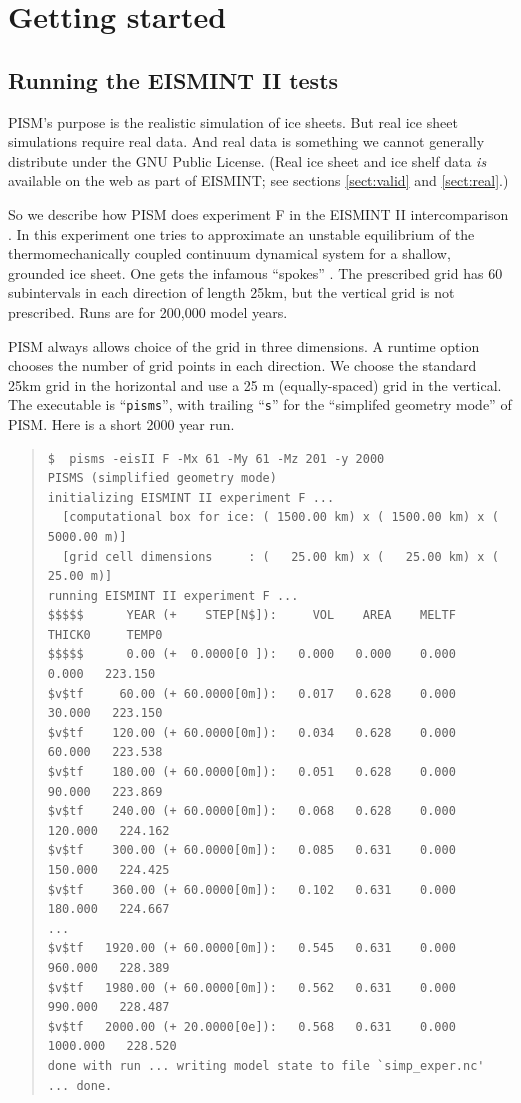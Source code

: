\documentclass[12pt,final]{amsart}
\renewcommand{\t}[1]{\texttt{#1}}
\begin{document}
\clearpage\newpage
\section{Getting started}\label{sect:start}

\subsection{Running the EISMINT II tests}  PISM's purpose is the realistic simulation of ice sheets.  But real ice sheet simulations require real data.  And real data is something we cannot generally distribute under the GNU Public License.  (Real ice sheet and ice shelf data \emph{is} available on the web as part of EISMINT; see sections \ref{sect:valid} and \ref{sect:real}.)

So we describe how PISM does experiment F in the EISMINT II intercomparison \cite{EISMINT00}.  In this experiment one tries to approximate an unstable equilibrium of the thermomechanically coupled continuum dynamical system for a shallow, grounded ice sheet.  One gets the infamous ``spokes'' \cite{BBL,PayneBaldwin}.  The prescribed grid has 60 subintervals in each direction of length 25km, but the vertical grid is not prescribed.  Runs are for 200,000 model years.

PISM always allows choice of the grid in three dimensions.  A runtime option chooses the number of grid points in each direction.  We choose the standard 25km grid in the horizontal and use a 25 m (equally-spaced) grid in the vertical.  The executable is ``\t{pisms}'', with trailing ``\t{s}'' for the ``simplifed geometry mode'' of PISM.  Here is a short 2000 year run.

\small\begin{quote}\begin{verbatim}
$  pisms -eisII F -Mx 61 -My 61 -Mz 201 -y 2000
PISMS (simplified geometry mode)
initializing EISMINT II experiment F ...
  [computational box for ice: ( 1500.00 km) x ( 1500.00 km) x ( 5000.00 m)]
  [grid cell dimensions     : (   25.00 km) x (   25.00 km) x (   25.00 m)]
running EISMINT II experiment F ...
$$$$$      YEAR (+    STEP[N$]):     VOL    AREA    MELTF     THICK0     TEMP0
$$$$$      0.00 (+  0.0000[0 ]):   0.000   0.000    0.000      0.000   223.150
$v$tf     60.00 (+ 60.0000[0m]):   0.017   0.628    0.000     30.000   223.150
$v$tf    120.00 (+ 60.0000[0m]):   0.034   0.628    0.000     60.000   223.538
$v$tf    180.00 (+ 60.0000[0m]):   0.051   0.628    0.000     90.000   223.869
$v$tf    240.00 (+ 60.0000[0m]):   0.068   0.628    0.000    120.000   224.162
$v$tf    300.00 (+ 60.0000[0m]):   0.085   0.631    0.000    150.000   224.425
$v$tf    360.00 (+ 60.0000[0m]):   0.102   0.631    0.000    180.000   224.667
...
$v$tf   1920.00 (+ 60.0000[0m]):   0.545   0.631    0.000    960.000   228.389
$v$tf   1980.00 (+ 60.0000[0m]):   0.562   0.631    0.000    990.000   228.487
$v$tf   2000.00 (+ 20.0000[0e]):   0.568   0.631    0.000   1000.000   228.520
done with run ... writing model state to file `simp_exper.nc' ... done.
\end{verbatim}
\end{quote}\normalsize
\end{document}
